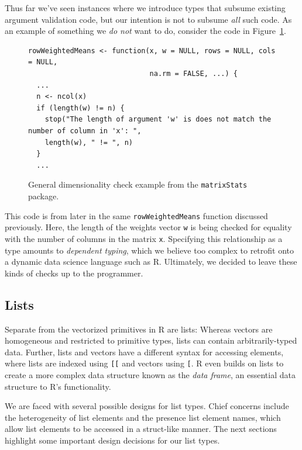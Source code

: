 \documentclass[acmsmall,review,anonymous]{acmart}\settopmatter{printfolios=true,printccs=false,printacmref=false}
\newcommand{\code}[1]{{\lstinline[style=Rin]!#1!}\xspace}
\begin{document}
Thus far we've seen instances where we introduce types that subsume existing
argument validation code, but our intention is not to subsume {\it all} such
code.  As an example of something we {\it do not} want to do, consider the
code in Figure~\ref{fig:general-validation-example}.

\begin{figure}[htbp]
\begin{center}

\begin{lstlisting}
rowWeightedMeans <- function(x, w = NULL, rows = NULL, cols = NULL,
                             na.rm = FALSE, ...) {
  ...
  n <- ncol(x)
  if (length(w) != n) {
    stop("The length of argument 'w' is does not match the number of column in 'x': ", 
    length(w), " != ", n)
  }
  ...
\end{lstlisting}

\caption{General dimensionality check example from the \code{matrixStats} package.}
\label{fig:general-validation-example}
\end{center}
\end{figure}

This code is from later in the same \code{rowWeightedMeans} function
discussed previously.  Here, the length of the weights vector \code{w} is
being checked for equality with the number of columns in the matrix
\code{x}.  Specifying this relationship as a type amounts to {\it dependent
  typing}, which we believe too complex to retrofit onto a dynamic data
science language such as R.  Ultimately, we decided to leave these kinds of
checks up to the programmer.  

%
%
%
%
\subsection{Lists}

Separate from the vectorized primitives in R are lists: Whereas vectors are
homogeneous and restricted to primitive types, lists can contain
arbitrarily-typed data.  Further, lists and vectors have a different syntax
for accessing elements, where lists are indexed using \code{[[} and vectors
    using \code{[}.  R even builds on lists to create a more complex data
      structure known as the {\it data frame}, an essential data structure
      to R's functionality.

We are faced with several possible designs for list types.  Chief concerns
include the heterogeneity of list elements and the presence list element
names, which allow list elements to be accessed in a struct-like manner.
The next sections highlight some important design decisions for our list
types.
\end{document}
